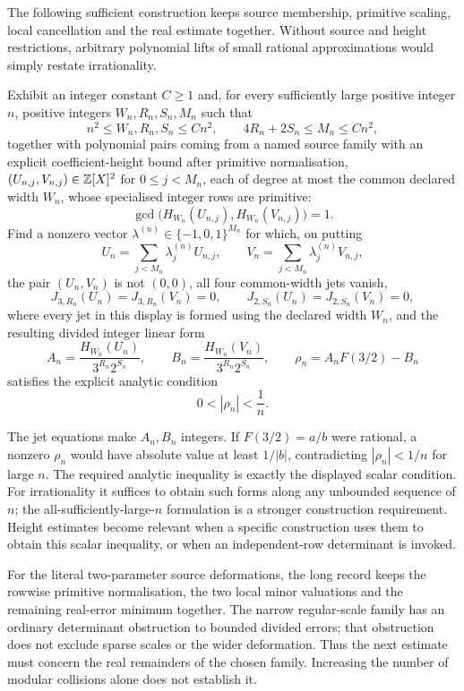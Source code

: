 \documentclass[11pt]{article}
\begin{document}
The following sufficient construction keeps source membership, primitive
scaling, local cancellation and the real estimate together.  Without source
and height restrictions, arbitrary polynomial lifts of small rational
approximations would simply restate irrationality.

\begin{problem}\label{prob:kernel}
Exhibit an integer constant \(C\ge1\) and, for every sufficiently large
positive integer \(n\), positive integers \(W_n,R_n,S_n,M_n\) such that
\[
 n^2\le W_n,R_n,S_n\le Cn^2,
 \qquad 4R_n+2S_n\le M_n\le Cn^2,
\]
together with polynomial pairs coming from a named source family with an
explicit coefficient-height bound after primitive normalisation,
\((U_{n,j},V_{n,j})\in\mathbb{Z}[X]^2\) for \(0\le j<M_n\), each of degree at most
the common declared width \(W_n\), whose specialised integer rows are
primitive:
\[
 \gcd\!\bigl(H_{W_n}(U_{n,j}),H_{W_n}(V_{n,j})\bigr)=1.
\]
Find a nonzero vector
\(\lambda^{(n)}\in\{-1,0,1\}^{M_n}\) for which, on putting
\[
 U_n=\sum_{j<M_n}\lambda^{(n)}_jU_{n,j},
 \qquad V_n=\sum_{j<M_n}\lambda^{(n)}_jV_{n,j},
\]
the pair \((U_n,V_n)\) is not \((0,0)\), all four common-width jets vanish,
\[
 J_{3,R_n}(U_n)=J_{3,R_n}(V_n)=0,
 \qquad J_{2,S_n}(U_n)=J_{2,S_n}(V_n)=0,
\]
where every jet in this display is formed using the declared width \(W_n\),
and the resulting divided integer linear form
\[
 A_n=\frac{H_{W_n}(U_n)}{3^{R_n}2^{S_n}},
 \qquad
 B_n=\frac{H_{W_n}(V_n)}{3^{R_n}2^{S_n}},
 \qquad
 \rho_n=A_nF(3/2)-B_n
\]
satisfies the explicit analytic condition
\[
 0<|\rho_n|<\frac1n.
\]
\end{problem}

The jet equations make $A_n,B_n$ integers.  If $F(3/2)=a/b$ were rational,
a nonzero $\rho_n$ would have absolute value at least $1/|b|$, contradicting
$|\rho_n|<1/n$ for large $n$.
The required analytic inequality is exactly the displayed scalar condition.
For irrationality it suffices to obtain such forms along any unbounded
sequence of $n$; the all-sufficiently-large-$n$ formulation is a stronger
construction requirement.  Height estimates become relevant when a specific
construction uses them to obtain this scalar inequality, or when an
independent-row determinant is invoked.

For the literal two-parameter source deformations, the long record keeps
the rowwise primitive normalisation, the two local minor valuations and the
remaining real-error minimum together.  The narrow regular-scale family has
an ordinary determinant obstruction to bounded divided errors; that
obstruction does not exclude sparse scales or the wider deformation.
Thus the next estimate must concern the real remainders of the chosen family.
Increasing the number of modular collisions alone does not establish it.
\end{document}
